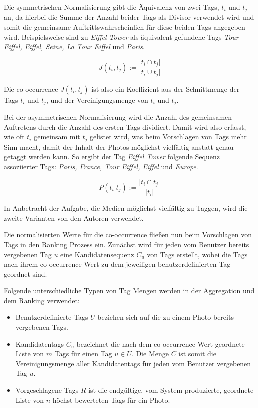 Die symmetrischen Normalisierung gibt die Äquivalenz von zwei Tags, ${t_i}$ und ${t_j}$ an, da hierbei die Summe der Anzahl beider Tags als Divisor verwendet wird und somit die gemeinsame Auftrittswahrscheinlich für diese beiden Tags angegeben wird. Beispielsweise sind zu \emph{Eiffel Tower} als äquivalent gefundene Tags \emph{Tour Eiffel, Eiffel, Seine, La Tour Eiffel} und \emph{Paris}.
\begin{figure}[hptb]
  \begin{equation}
  \label{symmetricNormalization}
   J(t_i, t_j) := \frac{\vert t_i \cap t_j \vert}{ \vert t_i \cup t_j \vert }
  \end{equation}
\end{figure}

Die co-occurrence $J(t_i, t_j)$ ist also ein Koeffizient aus der Schnittmenge der Tags ${t_i}$ und ${t_j}$, und der Vereinigungsmenge von ${t_i}$ und ${t_j}$.

Bei der asymmetrischen Normalisierung wird die Anzahl des gemeinsamen Auftretens durch die Anzahl des ersten Tags dividiert. Damit wird also erfasst, wie oft ${t_i}$ gemeinsam mit ${t_j}$ gelistet wird, was beim Vorschlagen von Tags mehr Sinn macht, damit der Inhalt der Photos möglichst vielfältig anstatt genau getaggt werden kann. So ergibt der Tag \emph{Eiffel Tower} folgende Sequenz assoziierter Tags: \emph{Paris, France, Tour Eiffel, Eiffel} und \emph{Europe}.
\begin{figure}[hptb]
 \begin{equation}
 \label{asymmetricNormalization}
  P(t_i \vert t_j) := \frac{\vert t_i \cap t_j \vert}{ \vert t_i \vert }
 \end{equation}
\end{figure}

In Anbetracht der Aufgabe, die Medien möglichst vielfältig zu Taggen, wird die zweite Varianten von den Autoren verwendet.

Die normalisierten Werte für die co-occurrence fließen nun beim Vorschlagen von Tags in den Ranking Prozess ein. Zunächst wird für jeden vom Benutzer bereits vergebenen Tag $u$ eine Kandidatensequenz $C_u$ von Tags erstellt, wobei die Tags nach ihrem co-occurrence Wert zu dem jeweiligen benutzerdefinierten Tag geordnet sind.

Folgende unterschiedliche Typen von Tag Mengen werden in der Aggregation und dem Ranking verwendet:
\begin{itemize}
  \item Benutzerdefinierte Tags $U$ beziehen sich auf die zu einem Photo bereits vergebenen Tags.
  \item Kandidatentags $C_u$ bezeichnet die nach dem co-occurrence Wert geordnete Liste von $m$ Tags für einen Tag $u \in U$. Die Menge $C$ ist somit die Vereinigungsmenge aller Kandidatentags für jeden vom Benutzer vergebenen Tag $u$.
  \item Vorgeschlagene Tags $R$ ist die endgültige, vom System produzierte, geordnete Liste von $n$ höchst bewerteten Tags für ein Photo.
\end{itemize}

